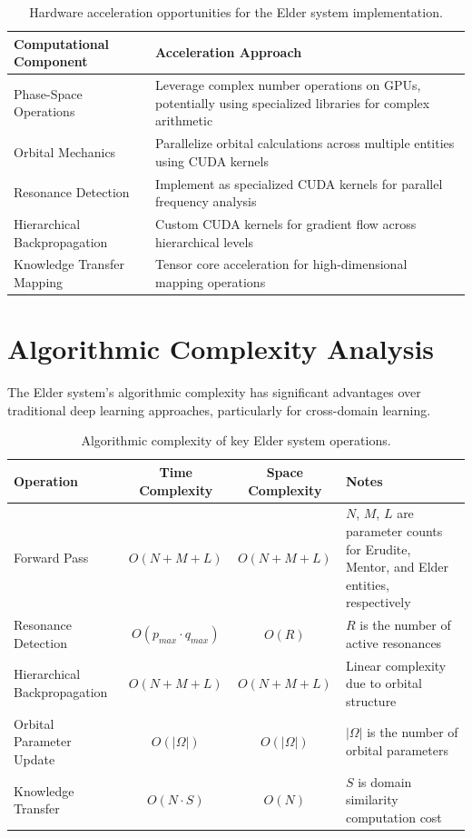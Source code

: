 \begin{table}[h]
\centering
\begin{tabular}{|l|p{9cm}|}
\hline
\textbf{Computational Component} & \textbf{Acceleration Approach} \\
\hline
Phase-Space Operations & Leverage complex number operations on GPUs, potentially using specialized libraries for complex arithmetic \\
\hline
Orbital Mechanics & Parallelize orbital calculations across multiple entities using CUDA kernels \\
\hline
Resonance Detection & Implement as specialized CUDA kernels for parallel frequency analysis \\
\hline
Hierarchical Backpropagation & Custom CUDA kernels for gradient flow across hierarchical levels \\
\hline
Knowledge Transfer Mapping & Tensor core acceleration for high-dimensional mapping operations \\
\hline
\end{tabular}
\caption{Hardware acceleration opportunities for the Elder system implementation.}
\label{tab:hardware_acceleration}
\end{table}

\section{Algorithmic Complexity Analysis}

The Elder system's algorithmic complexity has significant advantages over traditional deep learning approaches, particularly for cross-domain learning.

\begin{table}[h]
\centering
\begin{tabular}{|l|c|c|p{5cm}|}
\hline
\textbf{Operation} & \textbf{Time Complexity} & \textbf{Space Complexity} & \textbf{Notes} \\
\hline
Forward Pass & $O(N + M + L)$ & $O(N + M + L)$ & $N$, $M$, $L$ are parameter counts for Erudite, Mentor, and Elder entities, respectively \\
\hline
Resonance Detection & $O(p_{max} \cdot q_{max})$ & $O(R)$ & $R$ is the number of active resonances \\
\hline
Hierarchical Backpropagation & $O(N + M + L)$ & $O(N + M + L)$ & Linear complexity due to orbital structure \\
\hline
Orbital Parameter Update & $O(|\Omega|)$ & $O(|\Omega|)$ & $|\Omega|$ is the number of orbital parameters \\
\hline
Knowledge Transfer & $O(N \cdot S)$ & $O(N)$ & $S$ is domain similarity computation cost \\
\hline
\end{tabular}
\caption{Algorithmic complexity of key Elder system operations.}
\label{tab:algorithmic_complexity}
\end{table}

